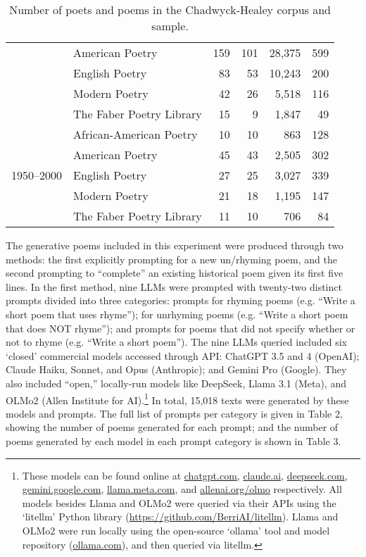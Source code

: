 \documentclass{simple-humanities}         %
\begin{document}
\begin{table}[H]
\begin{tabular}{llrrrr}
     & American Poetry & 159 & 101 & 28,375 & 599 \\
     & English Poetry & 83 & 53 & 10,243 & 200 \\
     & Modern Poetry & 42 & 26 & 5,518 & 116 \\
     & The Faber Poetry Library & 15 & 9 & 1,847 & 49 \\
    \cline{1-6}
    \multirow[t]{5}{*}{1950--2000} & African-American Poetry & 10 & 10 & 863 & 128 \\
     & American Poetry & 45 & 43 & 2,505 & 302 \\
     & English Poetry & 27 & 25 & 3,027 & 339 \\
     & Modern Poetry & 21 & 18 & 1,195 & 147 \\
     & The Faber Poetry Library & 11 & 10 & 706 & 84 \\
    \cline{1-6}
    \bottomrule
    \end{tabular}
  \caption{Number of poets and poems in the Chadwyck-Healey corpus and sample.}
  \label{tab:num_poems_corpus}
  \end{table}

The generative poems included in this experiment were produced through two methods: the first explicitly prompting for a new un/rhyming poem, and the second prompting to ``complete'' an existing historical poem given its first five lines.
In the first method, nine LLMs were prompted with twenty-two distinct prompts divided into three categories: prompts for rhyming poems (e.g. ``Write a short poem that uses rhyme''); for unrhyming poems (e.g. ``Write a short poem that does NOT rhyme''); and prompts for poems that did not specify whether or not to rhyme (e.g. ``Write a short poem'').
The nine LLMs queried included six `closed' commercial models accessed through API: ChatGPT 3.5 and 4 (OpenAI); Claude Haiku, Sonnet, and Opus (Anthropic); and Gemini Pro (Google).
They also included ``open,'' locally-run models like DeepSeek, Llama 3.1 (Meta), and OLMo2 (Allen Institute for AI).\footnote{These models can be found online at \url{chatgpt.com}, \url{claude.ai}, \url{deepseek.com}, \url{gemini.google.com}, \url{llama.meta.com}, and \url{allenai.org/olmo} respectively. All models besides Llama and OLMo2 were queried via their APIs using the `litellm' Python library (\url{https://github.com/BerriAI/litellm}). Llama and OLMo2 were run locally using the open-source `ollama' tool and model repository (\url{ollama.com}), and then queried via litellm.}
In total, 15,018 texts were generated by these models and prompts.
The full list of prompts per category is given in Table 2, showing the number of poems generated for each prompt; and the number of poems generated by each model in each prompt category is shown in Table 3.
\end{document}
